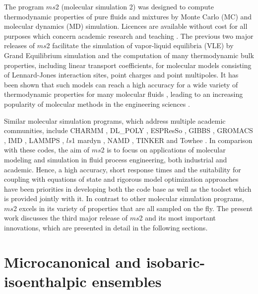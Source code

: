 \documentclass[preprint,12pt]{elsarticle}
\begin{document}
The program $ms$2 (molecular simulation 2) was designed to compute thermodynamic properties of pure fluids and mixtures by Monte Carlo (MC) and molecular dynamics (MD) simulation. Licences are available without cost for all purposes which concern academic research and teaching \cite{ms2web}. The previous two major releases of $ms$2 \cite{ms2,ms2_2.0} facilitate the simulation of vapor-liquid equilibria (VLE) by Grand Equilibrium simulation and the computation of many thermodynamic bulk properties, including linear transport coefficients, for molecular models consisting of Lennard-Jones interaction sites, point charges and point multipoles. It has been shown that such models can reach a high accuracy for a wide variety of thermodynamic properties for many molecular fluids \cite{nieto2007anisotropic,el2011thermodynamic,huang2011vapor,ketko2011development,reiser2015density,werth2015molecular}, leading to an increasing popularity of molecular methods in the engineering sciences \cite{srivastava2011phase,lu2014adsorption,sharma2015molecular,kern2016molecular,muscatello}.

Similar molecular simulation programs, which address multiple academic communities, include CHARMM \cite{brooks2009charmm}, DL\_POLY \cite{todorov2006dl_poly_3}, ESPResSo \cite{limbach2006espresso}, GIBBS \cite{lagache2001prediction}, GROMACS \cite{abraham2015gromacs}, IMD \cite{roth2000molecular}, LAMMPS \cite{plimpton1995fast}, $ls$1 mardyn \cite{niethammer2014ls1}, NAMD \cite{phillips2005scalable}, TINKER \cite{ren2003polarizable} and Towhee \cite{martin2013mcccs}. In comparison with these codes, the aim of $ms$2 is to focus on applications of molecular modeling and simulation in fluid process engineering, both industrial and academic. Hence, a high accuracy, short response times and the suitability for coupling with equations of state \cite{koster2016automatized, thol2016equation} and rigorous model optimization approaches \cite{hulsmann2010grow, hulsmann2010assessment, stobener2014multicriteria} have been priorities in developing both the code base as well as the toolset which is provided jointly with it. \textcolor[rgb]{0,0.58,0}{In contrast to other molecular simulation programs, $ms$2 excels in its variety of properties that are all sampled on the fly.} The present work discusses the third major release of $ms$2 and its most important innovations, which are presented in detail in the following sections.


\section{Microcanonical and isobaric-isoenthalpic ensembles}
\label{sec:ensembles} 
\end{document}
